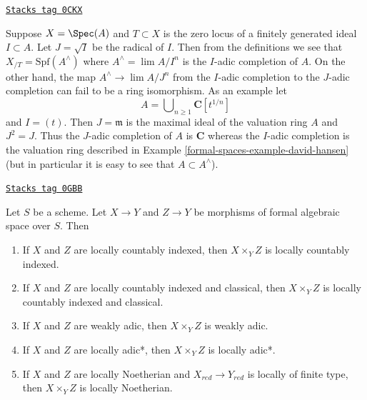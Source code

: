 \begin{remark}[Warning]

\label{formal-spaces-remark-warning-completion}
\href{https://stacks.math.columbia.edu/tag/0CKX}{\texttt{Stacks tag 0CKX}}

Suppose $X = \Spec(A)$ and $T \subset X$ is the zero locus of a
finitely generated ideal $I \subset A$. Let $J = \sqrt{I}$ be
the radical of $I$. Then from the definitions we see that
$X_{/T} = \text{Spf}(A^\wedge)$ where $A^\wedge = \lim A/I^n$ is
the $I$-adic completion of $A$. On the other hand, the map
$A^\wedge \to \lim A/J^n$ from the $I$-adic completion to
the $J$-adic completion can fail to be a ring isomorphism.
As an example let
$$
A = \bigcup\nolimits_{n \geq 1} \mathbf{C}[t^{1/n}]
$$
and $I = (t)$. Then $J = \mathfrak m$ is the maximal ideal
of the valuation ring $A$ and $J^2 = J$. Thus the $J$-adic completion
of $A$ is $\mathbf{C}$ whereas the $I$-adic completion
is the valuation ring described in Example \ref{formal-spaces-example-david-hansen}
(but in particular it is easy to see that $A \subset A^\wedge$).
\end{remark}

\begin{lemma}
\label{formal-spaces-lemma-types-fibre-products}
\href{https://stacks.math.columbia.edu/tag/0GBB}{\texttt{Stacks tag 0GBB}}

Let $S$ be a scheme. Let $X \to Y$ and $Z \to Y$ be
morphisms of formal algebraic space over $S$. Then
\begin{enumerate}
\item If $X$ and $Z$ are locally countably indexed, then $X \times_Y Z$
is locally countably indexed.
\item If $X$ and $Z$ are locally countably indexed and classical,
then $X \times_Y Z$ is locally countably indexed and classical.
\item If $X$ and $Z$ are weakly adic, then $X \times_Y Z$
is weakly adic.
\item If $X$ and $Z$ are locally adic*, then $X \times_Y Z$ is
locally adic*.
\item If $X$ and $Z$ are locally Noetherian and $X_{red} \to Y_{red}$
is locally of finite type, then $X \times_Y Z$ is locally Noetherian.
\end{enumerate}
\end{lemma}

